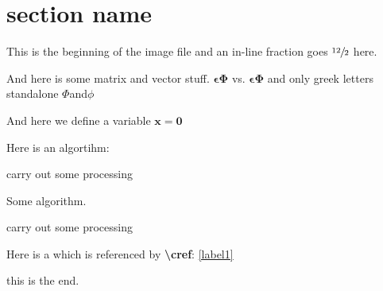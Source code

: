 \section{section name}
\label{sec:test_section}

This is the beginning of the image file and an in-line fraction
goes $\sfrac{12}{2}$ here. 
 

And here is some matrix and vector stuff.  $\bm{\epsilon} \bm{\Phi}$ vs.  $\mathbf{\epsilon} \mathbf{\Phi}$ and only greek letters standalone $\Phi $and$ \phi$
 
 And here we define a variable  
 \newcommand{\xVector}{\mathbf x}
     $\xVector = \mathbf 0$

Here is an algortihm:
\begin{algorithmic}
    \STATE carry out some processing
    \ENDFOR
\end{algorithmic}

\begin{algorithm}
  \caption{Some algorithm.}
  \begin{algorithmic}
    \STATE carry out some processing
    \ENDFOR
  \end{algorithmic}
\end{algorithm}

Here is a which is referenced by {\bfseries \textbackslash cref}: \cref{label1}





\newlength\fheight
\newlength\fwidth
\setlength\fheight{4cm}
\setlength\fwidth{6cm}
%
%
%
%
    











this is the end.
